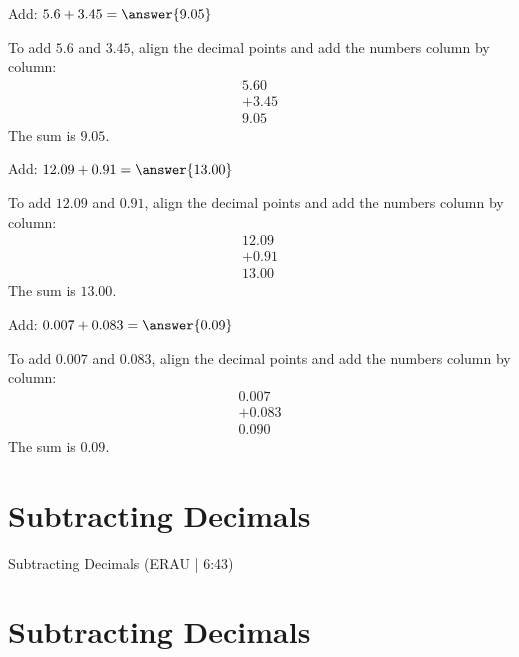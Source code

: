 \documentclass{ximera}
\begin{document}
\begin{problem}
Add: $5.6 + 3.45 = \answer{9.05}$
\begin{feedback}
To add $5.6$ and $3.45$, align the decimal points and add the numbers column by column:
\begin{align*}
  5.60 \\
+ 3.45 \\
\hline
  9.05
\end{align*}
The sum is $9.05$.
\end{feedback}
\end{problem}

\begin{problem}
Add: $12.09 + 0.91 = \answer{13.00}$
\begin{feedback}
To add $12.09$ and $0.91$, align the decimal points and add the numbers column by column:
\begin{align*}
  12.09 \\
+  0.91 \\
\hline
  13.00
\end{align*}
The sum is $13.00$.
\end{feedback}
\end{problem}

\begin{problem}
Add: $0.007 + 0.083 = \answer{0.09}$
\begin{feedback}
To add $0.007$ and $0.083$, align the decimal points and add the numbers column by column:
\begin{align*}
  0.007 \\
+ 0.083 \\
\hline
  0.090
\end{align*}
The sum is $0.09$.
\end{feedback}
\end{problem}


\section*{Subtracting Decimals}

Subtracting Decimals (ERAU | 6:43)



\section*{Subtracting Decimals} 
\end{document}
